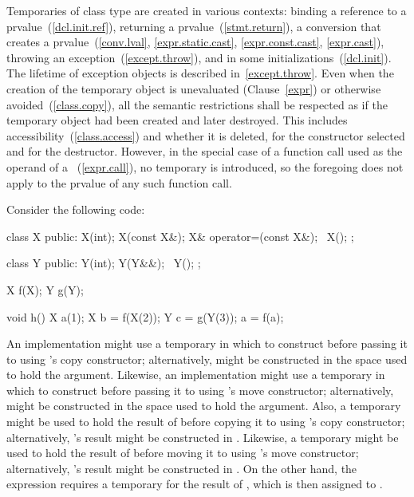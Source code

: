 \pnum
{}%
%
%
%
%
Temporaries of class type are created in various contexts:
binding a reference to a prvalue~(\ref{dcl.init.ref}),
returning a prvalue~(\ref{stmt.return}),
a conversion that creates a prvalue~(\ref{conv.lval}, \ref{expr.static.cast},
\ref{expr.const.cast}, \ref{expr.cast}),
throwing an exception~(\ref{except.throw}), and in some initializations~(\ref{dcl.init}).
\enternote
The lifetime of exception objects is described in~\ref{except.throw}.
\exitnote
Even when the creation of the temporary object is
unevaluated (Clause~\ref{expr}) or otherwise
avoided~(\ref{class.copy}),
all the semantic restrictions shall be respected as if the temporary object
had been created and later destroyed.
\enternote
This includes accessibility~(\ref{class.access}) and whether it is deleted,
for the constructor selected and for the destructor. However, in the special
case of a function call used as the operand of a
~(\ref{expr.call}), no temporary is introduced,
so the foregoing does not apply to the prvalue of any such function call.
\exitnote

\pnum
\enterexample Consider the following code:
\begin{codeblock}
class X {
public:
  X(int);
  X(const X&);
  X& operator=(const X&);
  ~X();
};

class Y {
public:
  Y(int);
  Y(Y&&);
  ~Y();
};

X f(X);
Y g(Y);

void h() {
  X a(1);
  X b = f(X(2));
  Y c = g(Y(3));
  a = f(a);
}
\end{codeblock}

%
%
An implementation might use a temporary in which to construct
before passing it to
using
's
copy constructor; alternatively,
might be constructed in the space used to hold the argument.
Likewise, an implementation might use a temporary in which to construct
 before passing it to  using 's move constructor;
alternatively,  might be constructed in the space used to hold the argument.
Also, a temporary might be used to hold the result of
before copying it to
using
's
copy constructor; alternatively,
's
result might be constructed in
.
Likewise, a temporary might be used to hold the result of  before
moving it to  using 's move constructor; alternatively, 's
result might be constructed in .
On the other hand, the expression
requires a temporary for
the result of , which is then assigned to .
\exitexample

